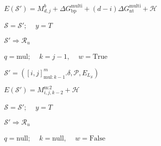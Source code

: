 \begin{algorithm}
\begin{algorithmic}[1]
		\State $E(\mathcal{S}') = M^b_{d,j} + \Delta G_\text{bp}^\text{multi}+ (d-i) \Delta G_\text{nt}^\text{multi} + \mathcal{H}$
		
		
		
		
		\State $\mathcal{S} = \mathcal{S}'$; \ \  $y = T$
		
		\Else
		
		\State $\mathcal{S}' \Rightarrow \mathcal{R}_u$		
		\EndIf
		
		
		
		\EndIf
		
		
		\EndFor
		\EndIf
		
		
		\State $q = \text{mul}$; \ \ $k = j-1$, \ \ $w= \mathrm{True}$
		\EndIf	
		
		
		\State  $\mathcal{S}' = ([i,j]^m_{\text{mul}:k-1}.\delta, \mathcal{P}, E_{L_{\mathcal{S}}})$ 
		
		\State $E(\mathcal{S}') = M_{i,j,k-2}^\text{m:2} + \mathcal{H}$
		
		
		
		\State $\mathcal{S} = \mathcal{S}'$; \ \  $y = T$
		
		\Else
		
		\State $\mathcal{S}' \Rightarrow \mathcal{R}_u$		
		\EndIf
		
		\EndIf
		
		\EndIf
		
		\State $q = \text{null}$; \ \ $k = \text{null}$, \ \ $w= \mathrm{False}$ 
		\EndIf	
		
		
		
		
	\end{algorithmic}
\end{algorithm}




